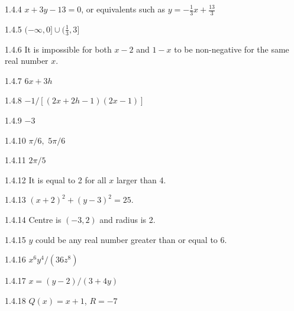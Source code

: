 \begin{Answer}{1.4.4}
	$x+3y-13=0$, or equivalents such as $y=-\frac{1}{3}x+\frac{13}{3}$
\end{Answer}
\begin{Answer}{1.4.5}
	$(-\infty,0]\cup(\frac{1}{3},3]$
\end{Answer}
\begin{Answer}{1.4.6}
	It is impossible for both $x-2$ and $1-x$ to be non-negative
	for the same real number $x$.
\end{Answer}
\begin{Answer}{1.4.7}
	$6x+3h$
\end{Answer}
\begin{Answer}{1.4.8}
	$-1/\left[(2x+2h-1)(2x-1)\right]$
\end{Answer}
\begin{Answer}{1.4.9}
	$-3$
\end{Answer}
\begin{Answer}{1.4.10}
	$\pi /6,$ $5\pi /6$
\end{Answer}
\begin{Answer}{1.4.11}
	$2\pi/5$
\end{Answer}
\begin{Answer}{1.4.12}
	It is equal to 2 for all $x$ larger than 4.
\end{Answer}
\begin{Answer}{1.4.13}
	$(x+2)^2+(y-3)^2=25$.
\end{Answer}
\begin{Answer}{1.4.14}
	Centre is $(-3,2)$ and radius is 2.
\end{Answer}
\begin{Answer}{1.4.15}
	$y$ could be any real number greater than or equal to 6.
\end{Answer}
\begin{Answer}{1.4.16}
	$x^6 y^4/(36z^8)$
\end{Answer}
\begin{Answer}{1.4.17}
	$x=(y-2)/(3+4y)$
\end{Answer}
\begin{Answer}{1.4.18}
	$Q(x)=x+1$, $R=-7$
\end{Answer}
